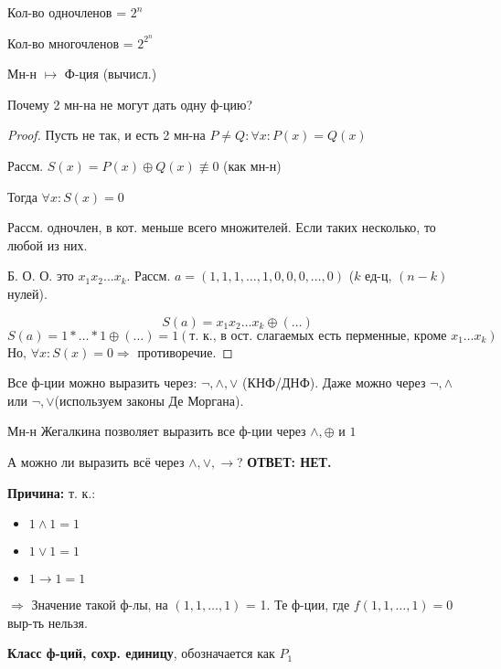 Кол-во одночленов = $2^{n}$

Кол-во многочленов = $2^{2^{n}}$

Мн-н $\mapsto$ Ф-ция (вычисл.)

Почему 2 мн-на не могут дать одну ф-цию?
\begin{figure}[ht]
    \centering
    \caption{}
    \label{fig:polys-and-functions}
\end{figure}
\begin{proof}
Пусть не так, и есть 2 мн-на $P \neq Q \colon \forall x \colon P(x) = Q(x)$

Рассм. $S(x) = P(x) \oplus Q(x) \not\equiv 0$ (как мн-н)

Тогда $\forall x \colon S(x) = 0$

Рассм. одночлен, в кот. меньше всего множителей. Если таких несколько, то любой из них.

Б. О. О. это $x_1 x_2 \ldots x_k$. Рассм. $a = (1, 1, 1, \ldots, 1, 0, 0, 0, \ldots, 0)$ ($k$ ед-ц, $(n - k)$ нулей).

\[
S(a) = x_1 x_2 \ldots x_k \oplus (\ldots )
\] 
\[
S(a) = 1 * \ldots * 1 \oplus (\ldots ) = 1 (\text{т. к., в ост. слагаемых есть перменные, кроме $x_1\ldots x_k$})
\] 
Но, $\forall x \colon  S(x) = 0 \Rightarrow $ противоречие.
\end{proof}

Все ф-ции можно выразить через: $\neg, \land, \lor$ (КНФ/ДНФ). Даже можно через $\neg, \land$ или $\neg, \lor$(используем законы Де Моргана).

Мн-н Жегалкина позволяет выразить все ф-ции через $\land, \oplus $ и $1$

А можно ли выразить всё через $\land, \lor, \rightarrow$? \textbf{ОТВЕТ: НЕТ.}

\textbf{Причина:} т. к.:
\begin{itemize}
  \item $1 \land 1 = 1$
  \item $1 \lor 1 = 1$
  \item $1 \rightarrow 1 = 1$
\end{itemize}
$\Rightarrow$ Значение такой ф-лы, на $(1, 1, \ldots, 1)$ = 1. Те ф-ции, где $f(1, 1, \ldots, 1) = 0$ выр-ть нельзя.

\begin{symb}
\textbf{Класс ф-ций, сохр. единицу}, обозначается как $P_1$
\end{symb}

